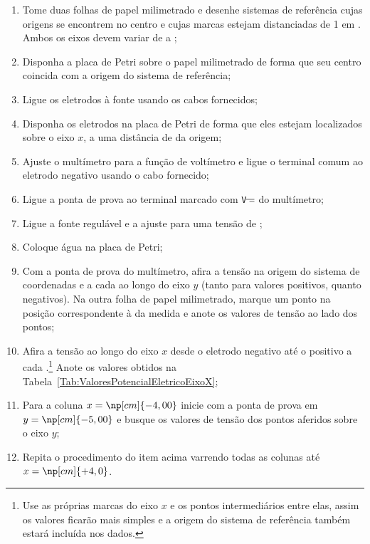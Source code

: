 \begin{enumerate}
	\item Tome duas folhas de papel milimetrado e desenhe sistemas de referência cujas origens se encontrem no centro e cujas marcas estejam distanciadas de 1 em . Ambos os eixos devem variar de  a ;
	\item Disponha a placa de Petri sobre o papel milimetrado de forma que seu centro coincida com a origem do sistema de referência;
	\item Ligue os eletrodos à fonte usando os cabos fornecidos;
	\item Disponha os eletrodos na placa de Petri de forma que eles estejam localizados sobre o eixo $x$, a uma distância de  da origem;
	\item Ajuste o multímetro para a função de voltímetro e ligue o terminal comum ao eletrodo negativo usando o cabo fornecido;
	\item Ligue a ponta de prova ao terminal marcado com \texttt{V$\mathdirectcurrent$} do multímetro;
	\item Ligue a fonte regulável e a ajuste para uma tensão de ;
	\item Coloque água na placa de Petri;
	\item Com a ponta de prova do multímetro, afira a tensão na origem do sistema de coordenadas e a cada  ao longo do eixo $y$ (tanto para valores positivos, quanto negativos). Na outra folha de papel milimetrado, marque um ponto na posição correspondente à da medida e anote os valores de tensão ao lado dos pontos;
	\item Afira a tensão ao longo do eixo $x$ desde o eletrodo negativo até o positivo a cada .\footnote{Use as próprias marcas do eixo $x$ e os pontos intermediários entre elas, assim os valores ficarão mais simples e a origem do sistema de referência também estará incluída nos dados.} Anote os valores obtidos na Tabela~\ref{Tab:ValoresPotencialEletricoEixoX};
	\item Para a coluna $x = \np[cm]{-4,00}$ inicie com a ponta de prova em $y = \np[cm]{-5,00}$ e busque os valores de tensão dos pontos aferidos sobre o eixo $y$;
	\item Repita o procedimento do item acima varrendo todas as colunas até $x = \np[cm]{+4,0}$.
\end{enumerate}

